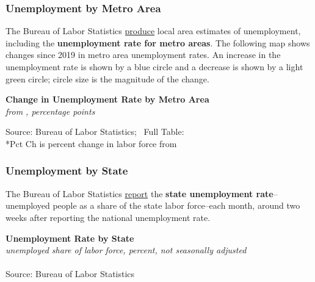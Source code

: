 \documentclass{report}
\newcommand{\tbllink}[1]{\href{https://raw.githubusercontent.com/bdecon/US-chartbook/master/chartbook/data/#1}{\faTable}}
\begin{document}
{\begin{minipage}{0.76\textwidth}
\subsubsection*{Unemployment by Metro Area}
\vspace{-1mm}

\small The Bureau of Labor Statistics \href{https://www.bls.gov/lau/}{produce} local area estimates of unemployment, including the \textbf{unemployment rate for metro areas}. The following map shows changes since 2019 in metro area unemployment rates. An increase in the unemployment rate is shown by a blue circle and a decrease is shown by a light green circle; circle size is the magnitude of the change. 


\end{minipage}
\vspace{1mm}

\begin{minipage}{0.82\textwidth}
\normalsize \textbf{Change in Unemployment Rate by Metro Area}\\
\footnotesize{\textit{from \unskip, percentage points}}
\vspace{-4mm}

\hspace*{-8mm} 
\vspace{-3mm}

\footnotesize{Source: Bureau of Labor Statistics; \ Full Table: \tbllink{msa_unemp_rate.csv} \\ \**Pct Ch is percent change in labor force from }
\end{minipage}
\newpage
\begin{minipage}{0.76\textwidth}
\subsubsection*{Unemployment by State}
\small The Bureau of Labor Statistics \href{https://www.bls.gov/lau/}{report} the \textbf{state unemployment rate}--unemployed people as a share of the state labor force--each month, around two weeks after reporting the national unemployment rate. 

\normalsize \textbf{Unemployment Rate by State}\\
\footnotesize{\textit{unemployed share of labor force, percent, not seasonally adjusted}}\\
\vspace{-2mm}
\hspace{-10mm}  \\
\footnotesize{Source: Bureau of Labor Statistics} \hspace{72mm} \tbllink{state_unrate.csv}
\end{minipage}
\newpage
\begin{minipage}{0.76\textwidth}

\end{minipage}}
\end{document}
